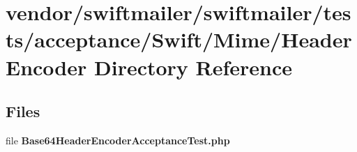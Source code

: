 \section{vendor/swiftmailer/swiftmailer/tests/acceptance/\+Swift/\+Mime/\+Header\+Encoder Directory Reference}
\label{dir_335e51aa8adc5388ec73bbbc95a05c3c}
\subsection*{Files}
\begin{DoxyCompactItemize}
\item 
file {\bf Base64\+Header\+Encoder\+Acceptance\+Test.\+php}
\end{DoxyCompactItemize}
